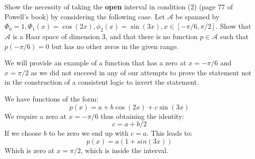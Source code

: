 \begin{problem}
Show the necessity of taking the \textbf{open} interval in condition (2) (page 77 of Powell's book) by considering the following case. Let $\mathcal{A}$ be spanned by $\Phi_0 = 1, \Phi_1(x) = \cos(2x), \phi_2(x) = \sin(3x), x \in [-\pi/6,\pi/2]$. Show that $\mathcal{A}$ is a Haar space of dimension 3, and that there is no function $p \in \mathcal{A}$ such that $p(-\pi/6) = 0$ but has no other zeros in the given range.
\end{problem}

\begin{solution}
We will provide an example of a function that has a zero at $x = -\pi/6$ and $x = \pi/2$ as we did not succeed in any of our attempts to prove the statement not in the construction of a consistent logic to invert the statement.

We have functions of the form:
\begin{equation}
p(x) = a + b\cos(2x)+c\sin(3x)
\end{equation}
We require a zero at $x = -\pi/6$ thus obtaining the identity:
\begin{equation}
c = a + b/2
\end{equation}
If we choose $b$ to be zero we end up with $c = a$. This leads to:
\begin{equation*}
p(x) = a(1+sin(3x))
\end{equation*}
Which is zero at $x = \pi/2$, which is inside the interval.
\end{solution}
